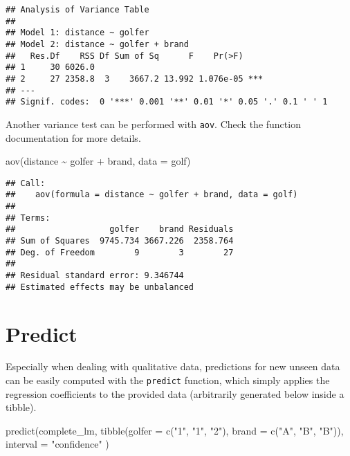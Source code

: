 \documentclass[
  oneside]{book}
\newenvironment{Shaded}{\begin{snugshade}}{\end{snugshade}}
\newcommand{\AttributeTok}[1]{\textcolor[rgb]{0.77,0.63,0.00}{#1}}
\newcommand{\FunctionTok}[1]{\textcolor[rgb]{0.00,0.00,0.00}{#1}}
\newcommand{\NormalTok}[1]{#1}
\newcommand{\SpecialCharTok}[1]{\textcolor[rgb]{0.00,0.00,0.00}{#1}}
\newcommand{\StringTok}[1]{\textcolor[rgb]{0.31,0.60,0.02}{#1}}
\begin{document}
\begin{verbatim}
## Analysis of Variance Table
## 
## Model 1: distance ~ golfer
## Model 2: distance ~ golfer + brand
##   Res.Df    RSS Df Sum of Sq      F    Pr(>F)    
## 1     30 6026.0                                  
## 2     27 2358.8  3    3667.2 13.992 1.076e-05 ***
## ---
## Signif. codes:  0 '***' 0.001 '**' 0.01 '*' 0.05 '.' 0.1 ' ' 1
\end{verbatim}

Another variance test can be performed with \texttt{aov}.
Check the function documentation for more details.

\begin{Shaded}
\begin{Highlighting}[]
\FunctionTok{aov}\NormalTok{(distance }\SpecialCharTok{\textasciitilde{}}\NormalTok{ golfer }\SpecialCharTok{+}\NormalTok{ brand, }\AttributeTok{data =}\NormalTok{ golf)}
\end{Highlighting}
\end{Shaded}

\begin{verbatim}
## Call:
##    aov(formula = distance ~ golfer + brand, data = golf)
## 
## Terms:
##                   golfer    brand Residuals
## Sum of Squares  9745.734 3667.226  2358.764
## Deg. of Freedom        9        3        27
## 
## Residual standard error: 9.346744
## Estimated effects may be unbalanced
\end{verbatim}

\hypertarget{predict}{%
\section{Predict}\label{predict}}

Especially when dealing with qualitative data, predictions for
new unseen data can be easily computed with the \texttt{predict} function,
which simply applies the regression coefficients to the provided data
(arbitrarily generated below inside a tibble).

\begin{Shaded}
\begin{Highlighting}[]
\FunctionTok{predict}\NormalTok{(complete\_lm, }\FunctionTok{tibble}\NormalTok{(}\AttributeTok{golfer =} \FunctionTok{c}\NormalTok{(}\StringTok{"1"}\NormalTok{, }\StringTok{"1"}\NormalTok{, }\StringTok{"2"}\NormalTok{), }\AttributeTok{brand =} \FunctionTok{c}\NormalTok{(}\StringTok{"A"}\NormalTok{, }\StringTok{"B"}\NormalTok{, }\StringTok{"B"}\NormalTok{)),}
  \AttributeTok{interval =} \StringTok{"confidence"}
\NormalTok{)}
\end{Highlighting}
\end{Shaded}
\end{document}
